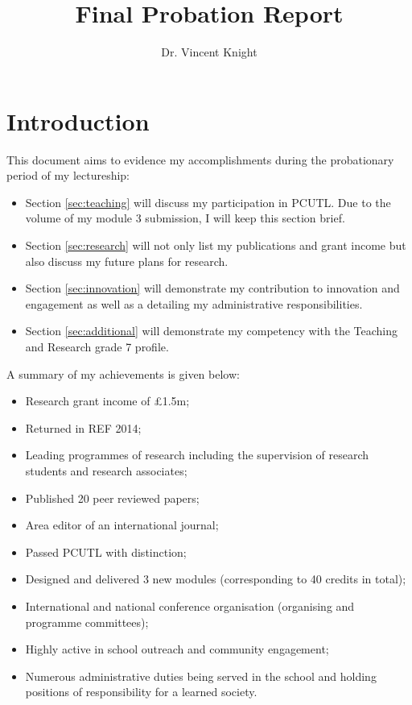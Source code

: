 \documentclass{article}
\title{Final Probation Report}
\author{Dr. Vincent Knight}
\begin{document}
\maketitle

\section{Introduction}\label{sec:introduction}

This document aims to evidence my accomplishments during the probationary period of my lectureship:

\begin{itemize}
    \item Section \ref{sec:teaching} will discuss my participation in PCUTL.
    Due to the volume of my module 3 submission, I will keep this section brief.
    \item Section \ref{sec:research} will not only list my publications and grant income but also discuss my future plans for research.
    \item Section \ref{sec:innovation} will demonstrate my contribution to innovation and engagement as well as a detailing my administrative responsibilities.
    \item Section \ref{sec:additional} will demonstrate my competency with the Teaching and Research grade 7 profile.
\end{itemize}

A summary of my achievements is given below:

\begin{itemize}
    \item Research grant income of \pounds1.5m;
    \item Returned in REF        2014;
    \item Leading programmes of research including the supervision of research students and research associates;
    \item Published 20 peer reviewed papers;
    \item Area editor of an international journal;
    \item Passed PCUTL with distinction;
    \item Designed and delivered 3 new modules (corresponding to 40 credits in total);
    \item International and national conference organisation (organising and programme committees);
    \item Highly active in school outreach and community engagement;
    \item Numerous administrative duties being served in the school and holding positions of responsibility for a learned society.
\end{itemize}
\end{document}
